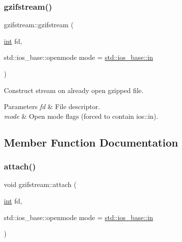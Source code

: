 \subsubsection{\texorpdfstring{gzifstream()}{gzifstream()}\hspace{0.1cm}{\footnotesize\ttfamily [6/6]}}
{\footnotesize\ttfamily gzifstream\+::gzifstream (\begin{DoxyParamCaption}\item[{\mbox{\hyperlink{ioapi_8h_a787fa3cf048117ba7123753c1e74fcd6}{int}}}]{fd,  }\item[{std\+::ios\+\_\+base\+::openmode}]{mode = {\ttfamily \mbox{\hyperlink{gun_8c_a8bab68b4d22f69428207fabb60dc4f5c}{std\+::ios\+\_\+base\+::in}}} }\end{DoxyParamCaption})\hspace{0.3cm}{\ttfamily [explicit]}}



Construct stream on already open gzipped file. 


\begin{DoxyParams}{Parameters}
{\em fd} & File descriptor. \\
\hline
{\em mode} & Open mode flags (forced to contain ios\+::in). \\
\hline
\end{DoxyParams}


\subsection{Member Function Documentation}
\mbox{\label{classgzifstream_a24aff901c395acbdaddb7878f4ddb7aa}} 
\subsubsection{\texorpdfstring{attach()}{attach()}}
{\footnotesize\ttfamily void gzifstream\+::attach (\begin{DoxyParamCaption}\item[{\mbox{\hyperlink{ioapi_8h_a787fa3cf048117ba7123753c1e74fcd6}{int}}}]{fd,  }\item[{std\+::ios\+\_\+base\+::openmode}]{mode = {\ttfamily \mbox{\hyperlink{gun_8c_a8bab68b4d22f69428207fabb60dc4f5c}{std\+::ios\+\_\+base\+::in}}} }\end{DoxyParamCaption})}



